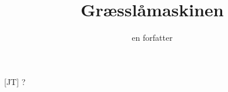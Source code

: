 \documentclass[a4paper,11pt]{article}
\title{Græsslåmaskinen}
\author{en forfatter}
\begin{document}
\maketitle

\begin{roles}
[JT] ?
\end{roles}

\begin{sketch}


\end{sketch}
\end{document}
